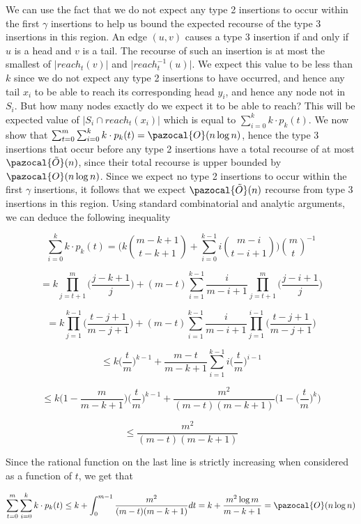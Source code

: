 \documentclass{report}
\begin{document}
We can use the fact that we do not expect any type 2 insertions to occur within the first $\gamma$ insertions to help us bound the expected recourse of the type 3 insertions in this region. An edge $(u,v)$ causes a type 3 insertion if and only if $u$ is a head and $v$ is a tail. The recourse of such an insertion is at most the smallest of $\vert reach_t(v)\vert$ and $\vert reach^{-1}_t(u)\vert$. We expect this value to be less than $k$ since we do not expect any type 2 insertions to have occurred, and hence any tail $x_{i}$ to be able to reach its corresponding head $y_{i}$, and hence any node not in $S_{i}$. But how many nodes exactly do we expect it to be able to reach? This will be expected value of $\vert S_{i} \cap reach_t(x_{i})\vert$ which is equal to $\sum_{i=0}^{k}k \cdot p_{k}(t)$. We now show that $\sum_{t=0}^{m} \sum_{i=0}^{k}k \cdot p_{k}(t) = \pazocal{O}(n \log n)$, hence the type 3 insertions that occur before any type 2 insertions have a total recourse of at most $\pazocal{\tilde{O}}(n)$, since their total recourse is upper bounded by $\pazocal{O}(n \log n)$. Since we expect no type 2 insertions to occur within the first $\gamma$ insertions, it follows that we expect $\pazocal{\tilde{O}}(n)$ recourse from type 3 insertions in this region. Using standard combinatorial and analytic arguments, we can deduce the following inequality

\[\sum_{i=0}^{k}k \cdot p_{k}(t) = \Bigg(k\binom{m-k+1}{t-k+1} + \sum_{i=0}^{k-1}i\binom{m-i}{t-i+1} \Bigg)\binom{m}{t}^{-1} \]

\[ = k\prod_{j=t+1}^{m}\bigg(\frac{j-k+1}{j}\bigg) + (m-t)\sum_{i=1}^{k-1}\frac{i}{m-i+1} \prod_{j=t+1}^{m}\bigg(\frac{j-i+1}{j}\bigg) \]

\[ = k\prod_{j=1}^{k-1}\bigg(\frac{t-j+1}{m-j+1}\bigg) + (m-t)\sum_{i=1}^{k-1}\frac{i}{m-i+1} \prod_{j=1}^{i-1}\bigg(\frac{t-j+1}{m-j+1}\bigg) \]

\[ \leq k\Big( \frac{t}{m} \Big)^{k-1} + \frac{m-t}{m-k+1}\sum_{i=1}^{k-1}i\Big( \frac{t}{m} \Big)^{i-1} \]

\[ \leq k\bigg(1 - \frac{m}{m-k+1} \bigg)\Big( \frac{t}{m} \Big)^{k-1} + \frac{m^2}{(m-t)(m-k+1)} \bigg(1-\Big( \frac{t}{m} \Big)^{k} \bigg) \]

\[ \leq \frac{m^2}{(m-t)(m-k+1)}\]

Since the rational function on the last line is strictly increasing when considered as a function of $t$, we get that

\[ \sum_{t=0}^{m} \sum_{i=0}^{k}k \cdot p_{k}(t) \leq k + \int_{0}^{m-1} \frac{m^2}{(m-t)(m-k+1)} dt = k + \frac{m^2 \log m}{m-k+1} = \pazocal{O}(n \log n)\]
\end{document}
